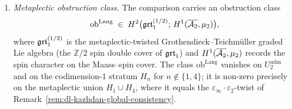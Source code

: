 \begin{conjecture}[Octachotomy--derived-Satake bridge at $g=2$;
\ClaimStatusConjectured]
\begin{enumerate}[label=\textup{(\arabic*)}]
the strict chain-level inversion of (1) extends to an
$(\infty,1)$-categorical inversion in the pro-object Malcev
ambient (Theorem~\textup{\ref{thm:codim3-heegner-transversality}}~(e)).
Under the Satake comparison of (2), this extension matches the
$\hbar=0$ limit of the $k$-th piece of the parabolic
Levi-stratification of $\BunSp$:
\[
 \bigl(\barB_X(A)\bigr)\Big|_{\bigcap H_{n_i}}
 \;\simeq\;
 \bigl(\Satakech_{\mathrm{Sp}_4}\bigr)\Big|_{\BunSp^{(k)}},
 \qquad
 k\in\{0,1,2,3\},
\]
where $\BunSp^{(k)}$ is the locally closed stratum of bundles whose
Harder--Narasimhan reduction lies in the parabolic with
$k$-dimensional unipotent radical
$\mathfrak{u}^{(k)}\subset\mathfrak{u}_P^{\mathrm{Sieg}}$.
\item \emph{Metaplectic obstruction class.} The comparison carries an
obstruction class
\begin{equation}
\label{eq:dl-ob-Lang}
 \mathrm{ob}^{\mathrm{Lang}}
 \;\in\;
 H^2\bigl(\mathfrak{grt}_1^{(1/2)};\,
 H^1(\overline{\mathcal{A}_2}, \mu_2)\bigr),
\end{equation}
where $\mathfrak{grt}_1^{(1/2)}$ is the metaplectic-twisted
Grothendieck--Teichm\"uller graded Lie algebra (the $\mathbb{Z}/2$
spin double cover of $\mathfrak{grt}_1$) and $H^1(\overline{\mathcal{A}_2},\mu_2)$ records
the spin character on the Maass--spin cover. The class
$\mathrm{ob}^{\mathrm{Lang}}$ vanishes on
$U_2^{\mathrm{adm}}$ and on the codimension-$1$ stratum $H_n$ for
$n\not\in\{1,4\}$; it is non-zero precisely on the metaplectic
union $H_1\cup H_4$, where it equals the
$\varepsilon_\infty\cdot\varepsilon_2$-twist of
Remark~\textup{\ref{rem:dl-kazhdan-global-consistency}}.
\end{enumerate}
\end{conjecture}

